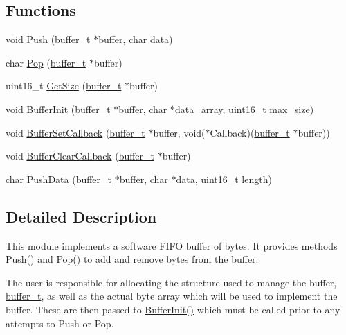\subsection*{Functions}
\begin{DoxyCompactItemize}
\item 
void \hyperlink{group__buffer_ga04dedbe0ceb1f5628c637eeb22aa99dc}{Push} (\hyperlink{structbuffer__t}{buffer\+\_\+t} $\ast$buffer, char data)
\item 
char \hyperlink{group__buffer_gaedbaa6dbfaaad8dffa141ed477e19b5f}{Pop} (\hyperlink{structbuffer__t}{buffer\+\_\+t} $\ast$buffer)
\item 
uint16\+\_\+t \hyperlink{group__buffer_ga01cf612935f5c2ae330920b78e8c8b9f}{Get\+Size} (\hyperlink{structbuffer__t}{buffer\+\_\+t} $\ast$buffer)
\item 
void \hyperlink{group__buffer_gaa5f81f606966455aa57a314ddd4e50d4}{Buffer\+Init} (\hyperlink{structbuffer__t}{buffer\+\_\+t} $\ast$buffer, char $\ast$data\+\_\+array, uint16\+\_\+t max\+\_\+size)
\item 
void \hyperlink{group__buffer_gaa42698076e74a52bac047b35b3bf6b97}{Buffer\+Set\+Callback} (\hyperlink{structbuffer__t}{buffer\+\_\+t} $\ast$buffer, void($\ast$Callback)(\hyperlink{structbuffer__t}{buffer\+\_\+t} $\ast$buffer))
\item 
void \hyperlink{group__buffer_ga56da56e8e27b583bd46efb4d391b53da}{Buffer\+Clear\+Callback} (\hyperlink{structbuffer__t}{buffer\+\_\+t} $\ast$buffer)
\item 
char \hyperlink{group__buffer_ga1a97e2269e9b21fc61b6e72ffdd2e374}{Push\+Data} (\hyperlink{structbuffer__t}{buffer\+\_\+t} $\ast$buffer, char $\ast$data, uint16\+\_\+t length)
\end{DoxyCompactItemize}


\subsection{Detailed Description}
This module implements a software F\+I\+F\+O buffer of bytes. It provides methods \hyperlink{group__buffer_ga04dedbe0ceb1f5628c637eeb22aa99dc}{Push()} and \hyperlink{group__buffer_gaedbaa6dbfaaad8dffa141ed477e19b5f}{Pop()} to add and remove bytes from the buffer.

The user is responsible for allocating the structure used to manage the buffer, \hyperlink{structbuffer__t}{buffer\+\_\+t}, as well as the actual byte array which will be used to implement the buffer. These are then passed to \hyperlink{group__buffer_gaa5f81f606966455aa57a314ddd4e50d4}{Buffer\+Init()} which must be called prior to any attempts to Push or Pop.

